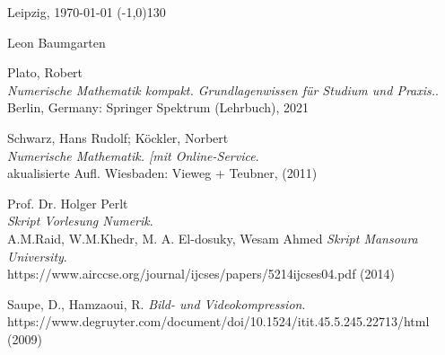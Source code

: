 \documentclass[12pt]{article}
\begin{document}
		Leipzig, \today \hspace{6cm} \line(-1,0){130}
		\begin{center}
			\hspace{36mm} {\footnotesize Leon Baumgarten}
		\end{center}
		
		\newpage
		\begin{thebibliography}{99} %
			Plato, Robert \\
			\emph{Numerische Mathematik kompakt. Grundlagenwissen für Studium und Praxis.}. \\
			Berlin, Germany: Springer Spektrum (Lehrbuch), 2021
			
			Schwarz, Hans Rudolf; Köckler, Norbert  \\
			\emph{ Numerische Mathematik. [mit Online-Service}. \\
			akualisierte Aufl. Wiesbaden: Vieweg + Teubner, (2011)
			
			Prof. Dr. Holger Perlt \\
			\emph{Skript Vorlesung Numerik}. \\
			
			A.M.Raid, W.M.Khedr, M. A. El-dosuky, Wesam Ahmed
			\emph{Skript Mansoura University}. \\
			https://www.airccse.org/journal/ijcses/papers/5214ijcses04.pdf (2014)
			
			
			Saupe, D., Hamzaoui, R. 
			\emph{Bild- und Videokompression}. \\
			https://www.degruyter.com/document/doi/10.1524/itit.45.5.245.22713/html (2009)
			
		\end{thebibliography}
				\newpage
	
	
\end{document}
